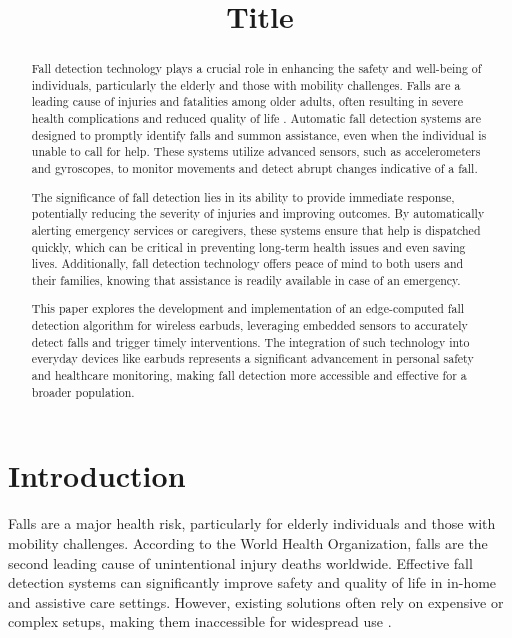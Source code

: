 \documentclass[conference]{IEEEtran}
\begin{document}
\title{Title}

\author{
}

\maketitle

\begin{abstract}
Fall detection technology plays a crucial role in enhancing the safety and well-being of individuals, particularly the elderly and those with mobility challenges. Falls are a leading cause of injuries and fatalities among older adults, often resulting in severe health complications and reduced quality of life \cite{worldhealthorganization}. Automatic fall detection systems are designed to promptly identify falls and summon assistance, even when the individual is unable to call for help. These systems utilize advanced sensors, such as accelerometers and gyroscopes, to monitor movements and detect abrupt changes indicative of a fall.

The significance of fall detection lies in its ability to provide immediate response, potentially reducing the severity of injuries and improving outcomes. By automatically alerting emergency services or caregivers, these systems ensure that help is dispatched quickly, which can be critical in preventing long-term health issues and even saving lives. Additionally, fall detection technology offers peace of mind to both users and their families, knowing that assistance is readily available in case of an emergency.

This paper explores the development and implementation of an edge-computed fall detection algorithm for wireless earbuds, leveraging embedded sensors to accurately detect falls and trigger timely interventions. The integration of such technology into everyday devices like earbuds represents a significant advancement in personal safety and healthcare monitoring, making fall detection more accessible and effective for a broader population.
\end{abstract}



\section{Introduction}
Falls are a major health risk, particularly for elderly individuals and those with mobility challenges. According to the World Health Organization, falls are the second leading cause of unintentional injury deaths worldwide. Effective fall detection systems can significantly improve safety and quality of life in in-home and assistive care settings. However, existing solutions often rely on expensive or complex setups, making them inaccessible for widespread use \cite{worldhealthorganization}.
\end{document}
